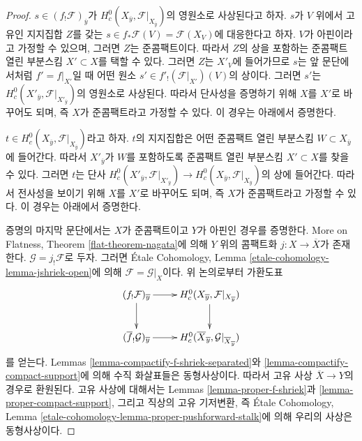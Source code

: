 \begin{proof}
\medskip\noindent
$s \in (f_!\mathcal{F})_{\overline{y}}$가
$H^0_c(X_{\overline{y}},\mathcal{F}|_{X_{\overline{y}}})$의 영원소로
사상된다고 하자. $s$가 $V$ 위에서 고유인 지지집합 $Z$를 갖는
$s \in f_*\mathcal{F}(V) = \mathcal{F}(X_V)$에 대응한다고 하자.
$V$가 아핀이라고 가정할 수 있으며, 그러면 $Z$는 준콤팩트이다.
따라서 $Z$의 상을 포함하는 준콤팩트 열린 부분스킴
$X' \subset X$를 택할 수 있다. 그러면 $Z$는 $X'_V$에 들어가므로
$s$는 앞 문단에서처럼 $f' = f|_{X'}$일 때 어떤 원소
$s' \in f'_!(\mathcal{F}|_{X'})(V)$의 상이다.
그러면 $s'$는
$H^0_c(X'_{\overline{y}},\mathcal{F}|_{X'_{\overline{y}}})$의
영원소로 사상된다. 따라서 단사성을 증명하기 위해 $X$를 $X'$로
바꾸어도 되며, 즉 $X$가 준콤팩트라고 가정할 수 있다. 이 경우는
아래에서 증명한다.

\medskip\noindent
$t \in H^0_c(X_{\overline{y}},
\mathcal{F}|_{X_{\overline{y}}})$라고 하자. $t$의 지지집합은 어떤
준콤팩트 열린 부분스킴 $W \subset X_{\overline{y}}$에 들어간다.
따라서 $X'_{\overline{y}}$가 $W$를 포함하도록 준콤팩트 열린 부분스킴
$X' \subset X$를 찾을 수 있다. 그러면 $t$는 단사
$H^0_c(X'_{\overline{y}}, \mathcal{F}|_{X'_{\overline{y}}}) \to
H^0_c(X_{\overline{y}}, \mathcal{F}|_{X_{\overline{y}}})$의 상에
들어간다. 따라서 전사성을 보이기 위해 $X$를 $X'$로
바꾸어도 되며, 즉 $X$가 준콤팩트라고 가정할 수 있다. 이 경우는
아래에서 증명한다.

\medskip\noindent
증명의 마지막 문단에서는 $X$가 준콤팩트이고 $Y$가 아핀인 경우를
증명한다. More on Flatness, Theorem \ref{flat-theorem-nagata}에 의해
$Y$ 위의 콤팩트화 $j : X \to \overline{X}$가 존재한다.
$\mathcal{G} = j_!\mathcal{F}$로 두자. 그러면 \'Etale Cohomology,
Lemma \ref{etale-cohomology-lemma-jshriek-open}에 의해
$\mathcal{F} = \mathcal{G}|_X$이다. 위 논의로부터 가환도표
$$
\xymatrix{
(f_!\mathcal{F})_{\overline{y}} \ar[r] \ar[d] &
H^0_c(X_{\overline{y}}, \mathcal{F}|_{X_{\overline{y}}}) \ar[d] \\
(\overline{f}_!\mathcal{G})_{\overline{y}} \ar[r] &
H^0_c(\overline{X}_{\overline{y}}, \mathcal{G}|_{\overline{X}_{\overline{y}}})
}
$$
를 얻는다. Lemmas \ref{lemma-compactify-f-shriek-separated}와
\ref{lemma-compactify-compact-support}에 의해 수직 화살표들은
동형사상이다. 따라서 고유 사상 $\overline{X} \to Y$의 경우로
환원된다. 고유 사상에 대해서는 Lemmas
\ref{lemma-proper-f-shriek}과 \ref{lemma-proper-compact-support},
그리고 직상의 고유 기저변환, 즉 \'Etale Cohomology, Lemma
\ref{etale-cohomology-lemma-proper-pushforward-stalk}에 의해 우리의
사상은 동형사상이다.
\end{proof}


